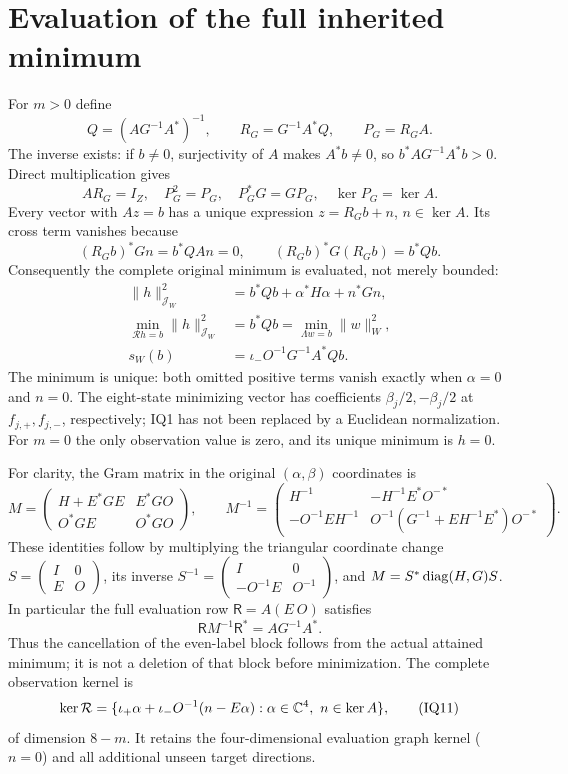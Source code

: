 \documentclass[11pt]{article}
\begin{document}
\section{Evaluation of the full inherited minimum}
For $m>0$ define
\[
 Q=(AG^{-1}A^*)^{-1},\qquad R_G=G^{-1}A^*Q,\qquad
 P_G=R_GA.                                          \tag{IQ6}
\]
The inverse exists: if $b\ne0$, surjectivity of $A$ makes $A^*b\ne0$,
so $b^*AG^{-1}A^*b>0$.  Direct multiplication gives
\[
 AR_G=I_Z,\quad P_G^2=P_G,\quad P_G^*G=GP_G,
 \quad\ker P_G=\ker A.                              \tag{IQ7}
\]
Every vector with $Az=b$ has a unique expression $z=R_Gb+n$, $n\in\ker A$.
Its cross term vanishes because
\[
 (R_Gb)^*Gn=b^*QA n=0,\qquad
 (R_Gb)^*G(R_Gb)=b^*Qb.
\]
Consequently the complete original minimum is evaluated, not merely bounded:
\[
 \begin{split}
 \|h\|_{\mathcal J_W}^2
   &=b^*Qb+\alpha^*H\alpha+n^*Gn,\\
 \min_{\mathcal Rh=b}\|h\|_{\mathcal J_W}^2
   &=b^*Qb
    =\min_{\Lambda w=b}\|w\|_W^2,\\
 s_W(b)&=\iota_-O^{-1}G^{-1}A^*Qb.
 \end{split}                                       \tag{IQ8}
\]
The minimum is unique: both omitted positive terms vanish exactly when
$\alpha=0$ and $n=0$.  The eight-state minimizing vector has coefficients
$\beta_j/2,-\beta_j/2$ at $f_{j,+},f_{j,-}$, respectively; IQ1 has not been
replaced by a Euclidean normalization.  For $m=0$ the only observation value
is zero, and its unique minimum is $h=0$.

For clarity, the Gram matrix in the original $(\alpha,\beta)$ coordinates is
\[
 M=\begin{pmatrix}
 H+E^*GE&E^*GO\\ O^*GE&O^*GO
 \end{pmatrix},\qquad
 M^{-1}=\begin{pmatrix}
 H^{-1}&-H^{-1}E^*O^{-*}\\
 -O^{-1}EH^{-1}&O^{-1}(G^{-1}+EH^{-1}E^*)O^{-*}
 \end{pmatrix}.                                    \tag{IQ9}
\]
These identities follow by multiplying the triangular coordinate change
$S=\left(\begin{smallmatrix}I&0\\E&O\end{smallmatrix}\right)$, its inverse
$S^{-1}=\left(\begin{smallmatrix}I&0\\-O^{-1}E&O^{-1}\end{smallmatrix}\right)$,
and $M=S^*\operatorname{diag}(H,G)S$.  In particular the full evaluation row
$\mathsf R=A(E\ O)$ satisfies
\[
 \mathsf R M^{-1}\mathsf R^*=AG^{-1}A^*.              \tag{IQ10}
\]
Thus the cancellation of the even-label block follows from the actual
attained minimum; it is not a deletion of that block before minimization.
The complete observation kernel is
\[
 \ker\mathcal R=
 \{\iota_+\alpha+\iota_-O^{-1}(n-E\alpha):
             \alpha\in\mathbb C^4,\ n\in\ker A\},          \tag{IQ11}
\]
of dimension $8-m$.  It retains the four-dimensional evaluation graph
kernel ($n=0$) and all additional unseen target directions.
\end{document}
